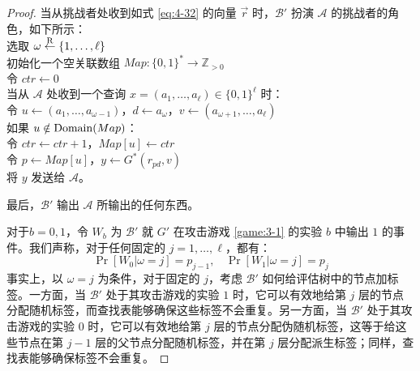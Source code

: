 \begin{proof}
\hspace*{5pt} 当从挑战者处收到如式 \ref{eq:4-32} 的向量 $\vec r$ 时，$\mathcal{B}'$ 扮演 $\mathcal{A}$ 的挑战者的角色，如下所示：\\
\hspace*{50pt} 选取 $\omega\overset{\rm R}\leftarrow\{1,\dots,\ell\}$\\
\hspace*{50pt} 初始化一个空关联数组 $Map:\{0,1\}^*\to\mathbb{Z}_{>0}$\\
\hspace*{50pt} 令 $ctr\leftarrow 0$\\
\hspace*{50pt} 当从 $\mathcal{A}$ 处收到一个查询 $x=(a_1,\dots,a_\ell)\in\{0,1\}^\ell$ 时：\\
\hspace*{75pt} 令 $u\leftarrow(a_1,\dots,a_{\omega-1})$，$d\leftarrow a_\omega$，$v\leftarrow(a_{\omega+1},\dots,a_\ell)$\\
\hspace*{75pt} 如果 $u\notin{\rm Domain}(Map)$：\\
\hspace*{100pt} 令 $ctr\leftarrow ctr+1$，$Map[u]\leftarrow ctr$\\
\hspace*{75pt} 令 $p\leftarrow Map[u]$，$y\leftarrow G^*(r_{pd},v)$\\
\hspace*{75pt} 将 $y$ 发送给 $\mathcal{A}$。

\vspace{3pt}

\hspace*{5pt} 最后，$\mathcal{B}'$ 输出 $\mathcal{A}$ 所输出的任何东西。

\vspace{5pt}

对于$b=0,1$，令 $W_b$ 为 $\mathcal{B}'$ 就 $G'$ 在攻击游戏 \ref{game:3-1} 的实验 $b$ 中输出 $1$ 的事件。我们声称，对于任何固定的 $j=1,\dots,\ell$，都有：
\[
\Pr[W_0|\omega=j]=p_{j-1},~~~~
\Pr[W_1|\omega=j]=p_j
\]
事实上，以 $\omega=j$ 为条件，对于固定的 $j$，考虑 $\mathcal{B}'$ 如何给评估树中的节点加标签。一方面，当 $\mathcal{B}'$ 处于其攻击游戏的实验 $1$ 时，它可以有效地给第 $j$ 层的节点分配随机标签，而查找表能够确保这些标签不会重复。另一方面，当 $\mathcal{B}'$ 处于其攻击游戏的实验 $0$ 时，它可以有效地给第 $j$ 层的节点分配伪随机标签，这等于给这些节点在第 $j-1$ 层的父节点分配随机标签，并在第 $j$ 层分配派生标签；同样，查找表能够确保标签不会重复。


\end{proof}
